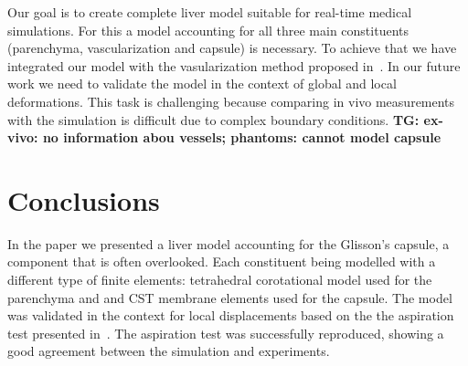 \documentclass{acm_proc_article-sp}
\newcommand{\TG}[1]{{\color{blue}\textbf{TG: #1}}}
\begin{document}
Our goal is to create complete liver model suitable for real-time medical
simulations. For this a model accounting for all three main constituents
(parenchyma, vascularization and capsule) is necessary. To achieve that we have
integrated our model with the vasularization method proposed
in~\cite{Peterlik2012}. In our future work we need to validate the model in the
context of global and local deformations. This task is challenging because
comparing in vivo measurements with the simulation is difficult due to complex
boundary conditions. 
\TG{ex-vivo: no information abou vessels; phantoms: cannot model capsule}


\section{Conclusions} %

In the paper we presented a liver model accounting for the Glisson's capsule, a component that is often overlooked. Each constituent being modelled with a different type 
of finite elements: tetrahedral corotational model used for the parenchyma and
and CST membrane elements used for the capsule. 
The model was validated in the context for local displacements based on the the aspiration test presented in~\cite{Hollenstein2006}. The aspiration test
was successfully reproduced, showing a good agreement between the simulation and experiments. 




%
%



\end{document}
